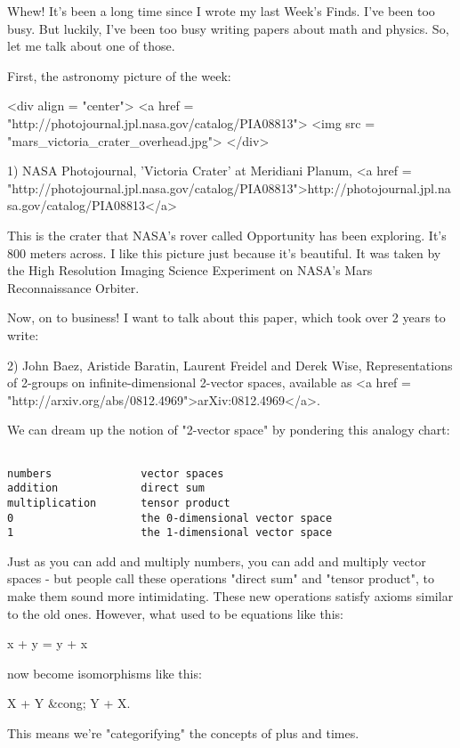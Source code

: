 


Whew!  It's been a long time since I wrote my last Week's Finds.
I've been too busy.  But luckily, I've been too busy writing papers 
about math and physics.  So, let me talk about one of those.  

First, the astronomy picture of the week:

<div align = "center">
<a href = "http://photojournal.jpl.nasa.gov/catalog/PIA08813">
<img src = "mars_victoria_crater_overhead.jpg">
</div>

1) NASA Photojournal, 'Victoria Crater' at Meridiani Planum,
<a href = "http://photojournal.jpl.nasa.gov/catalog/PIA08813">http://photojournal.jpl.nasa.gov/catalog/PIA08813</a>

This is the crater that NASA's rover called Opportunity has been
exploring.  It's 800 meters across.  I like this picture just 
because it's beautiful.  It was taken by the High Resolution 
Imaging Science Experiment on NASA's Mars Reconnaissance Orbiter. 

Now, on to business!  I want to talk about this paper, which
took over 2 years to write:

2) John Baez, Aristide Baratin, Laurent Freidel and Derek Wise,
Representations of 2-groups on infinite-dimensional 2-vector spaces,
available as <a href = "http://arxiv.org/abs/0812.4969">arXiv:0812.4969</a>.

We can dream up the notion of "2-vector space" by pondering
this analogy chart:


\begin{verbatim}

numbers              vector spaces
addition             direct sum
multiplication       tensor product       
0                    the 0-dimensional vector space
1                    the 1-dimensional vector space
\end{verbatim}
    

Just as you can add and multiply numbers, you can add and multiply
vector spaces - but people call these operations "direct sum" and
"tensor product", to make them sound more intimidating.  These new
operations satisfy axioms similar to the old ones.  However, what 
used to be equations like this:

x + y = y + x

now become isomorphisms like this:

X + Y &cong; Y + X.

This means we're "categorifying" the concepts of plus and times.

